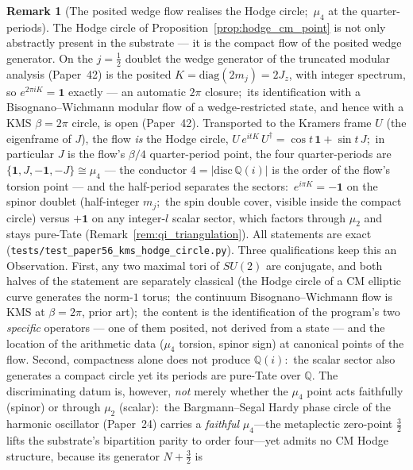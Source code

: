 \documentclass[11pt,a4paper]{article}
\theoremstyle{plain}
\theoremstyle{definition}
\newtheorem{remark}[theorem]{Remark}
\newcommand{\Q}{\mathbb{Q}}
\begin{document}
\begin{remark}[The posited wedge flow realises the Hodge circle;\ $\mu_4$ at the
quarter-periods]
\label{rem:kms_hodge_circle}
The Hodge circle of Proposition~\ref{prop:hodge_cm_point} is not only abstractly
present in the substrate --- it is the compact flow of the posited
wedge generator.  On the
$j=\tfrac12$ doublet the wedge generator of the truncated modular analysis
(Paper~42) is the posited $K=\mathrm{diag}(2m_j)=2J_z$, with integer spectrum, so
$e^{2\pi iK}=\mathbf 1$ exactly --- an automatic $2\pi$ closure;\ its
identification with a Bisognano--Wichmann modular flow of a
wedge-restricted state, and hence with a KMS $\beta=2\pi$ circle, is open
(Paper~42).  Transported to
the Kramers frame $U$ (the eigenframe of $J$), the flow \emph{is} the Hodge
circle, $U\,e^{itK}\,U^{\dagger} = \cos t\,\mathbf 1 + \sin t\,J$;\ in
particular $J$ is the flow's $\beta/4$ quarter-period point, the four
quarter-periods are $\{\mathbf 1, J, -\mathbf 1, -J\}\cong\mu_4$ --- the
conductor $4=|\mathrm{disc}\,\Q(i)|$ is the order of the flow's torsion point
--- and the half-period separates the sectors:\ $e^{i\pi K}=-\mathbf 1$ on the
spinor doublet (half-integer $m_j$;\ the spin double cover, visible inside the
compact circle) versus $+\mathbf 1$ on any integer-$l$ scalar sector, which
factors through $\mu_2$ and stays pure-Tate
(Remark~\ref{rem:qi_triangulation}).  All statements are exact
(\texttt{tests/test\_paper56\_kms\_hodge\_circle.py}).  Three qualifications
keep this an Observation.  First, any two maximal tori of $SU(2)$ are
conjugate, and both halves of the statement are separately classical (the Hodge
circle of a CM elliptic curve generates the norm-$1$ torus;\ the
continuum Bisognano--Wichmann flow is KMS at $\beta=2\pi$, prior art);\ the
content is the identification of the program's two \emph{specific}
operators --- one of them posited, not derived from a state --- and the location of the arithmetic data ($\mu_4$ torsion, spinor
sign) at canonical points of the flow.  Second, compactness alone does not
produce $\Q(i)$:\ the scalar sector also generates a compact circle yet its
periods are pure-Tate over $\Q$.  The discriminating datum is, however,
\emph{not} merely whether the $\mu_4$ point acts faithfully (spinor) or through
$\mu_2$ (scalar):\ the Bargmann--Segal Hardy phase circle of the harmonic
oscillator (Paper~24) carries a \emph{faithful} $\mu_4$---the metaplectic
zero-point $\tfrac32$ lifts the substrate's bipartition parity to order
four---yet admits no CM Hodge structure, because its generator $N+\tfrac32$ is

\end{remark}
\end{document}
